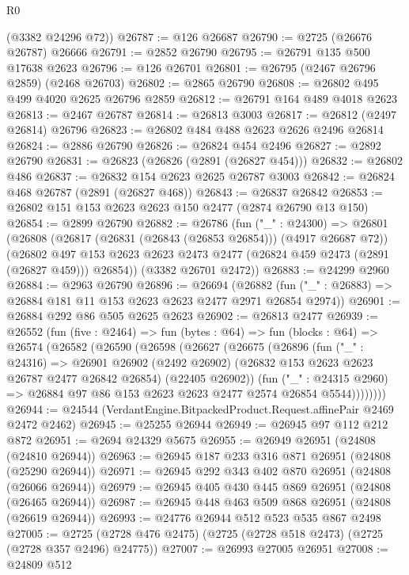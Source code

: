 \begin{lexlean}{R0}
\begin{coremodule}
      (@3382 @24296 @72))
@26787 := @126 @26687
@26790 := @2725 (@26676 @26787) @26666
@26791 := @2852 @26790
@26795 := @26791 @135 @500 @17638 @2623
@26796 := @126 @26701
@26801 := @26795 (@2467 @26796 @2859) (@2468 @26703)
@26802 := @2865 @26790
@26808 := @26802 @495 @499 @4020 @2625 @26796 @2859
@26812 := @26791 @164 @489 @4018 @2623
@26813 := @2467 @26787
@26814 := @26813 @3003
@26817 := @26812 (@2497 @26814) @26796
@26823 := @26802 @484 @488 @2623 @2626 @2496 @26814
@26824 := @2886 @26790
@26826 := @26824 @454 @2496
@26827 := @2892 @26790
@26831 := @26823 (@26826 (@2891 (@26827 @454)))
@26832 := @26802 @486
@26837 := @26832 @154 @2623 @2625 @26787 @3003
@26842 := @26824 @468 @26787 (@2891 (@26827 @468))
@26843 := @26837 @26842
@26853 := @26802 @151 @153 @2623 @2623 @150 @2477 (@2874 @26790 @13 @150)
@26854 := @2899 @26790
@26882 := @26786
    (fun ("_" : @24300) =>
    @26801
      (@26808
        (@26817 (@26831 (@26843 (@26853 @26854))) (@4917 @26687 @72))
        (@26802 @497 @153 @2623 @2623 @2473 @2477 (@26824 @459 @2473 (@2891 (@26827 @459))) @26854))
      (@3382 @26701 @2472))
@26883 := @24299 @2960
@26884 := @2963 @26790
@26896 := @26694
    (@26882 (fun ("_" : @26883) => @26884 @181 @11 @153 @2623 @2623 @2477 @2971 @26854 @2974))
@26901 := @26884 @292 @86 @505 @2625 @2623
@26902 := @26813 @2477
@26939 := @26552
    (fun (five : @2464) =>
    fun (bytes : @64) =>
    fun (blocks : @64) =>
    @26574
      (@26582
        (@26590
          (@26598
            (@26627
              (@26675
                (@26896
                  (fun ("_" : @24316) =>
                  @26901
                    @26902
                    (@2492 @26902)
                    (@26832 @153 @2623 @2623 @26787 @2477 @26842 @26854)
                    (@22405 @26902))
                  (fun ("_" : @24315 @2960) =>
                  @26884 @97 @86 @153 @2623 @2623 @2477 @2574 @26854 @5544))))))))
@26944 := @24544 (VerdantEngine.BitpackedProduct.Request.affinePair @2469 @2472 @2462)
@26945 := @25255 @26944
@26949 := @26945 @97 @112 @212 @872
@26951 := @2694 @24329 @5675
@26955 := @26949 @26951 (@24808 (@24810 @26944))
@26963 := @26945 @187 @233 @316 @871 @26951 (@24808 (@25290 @26944))
@26971 := @26945 @292 @343 @402 @870 @26951 (@24808 (@26066 @26944))
@26979 := @26945 @405 @430 @445 @869 @26951 (@24808 (@26465 @26944))
@26987 := @26945 @448 @463 @509 @868 @26951 (@24808 (@26619 @26944))
@26993 := @24776 @26944 @512 @523 @535 @867 @2498
@27005 := @2725 (@2728 @476 @2475) (@2725 (@2728 @518 @2473) (@2725 (@2728 @357 @2496) @24775))
@27007 := @26993 @27005 @26951
@27008 := @24809 @512

\end{coremodule}
\end{lexlean}

